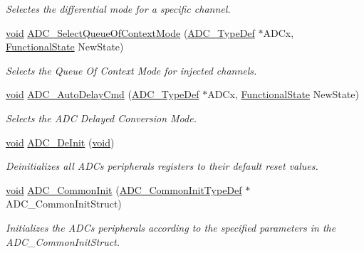 \begin{DoxyCompactItemize}
\begin{DoxyCompactList}\small\item\em Selectes the differential mode for a specific channel. \end{DoxyCompactList}\item 
\hyperlink{group___n_a_m_e_ga18028b8badbf1ea7e704ccac3c488e82}{void} \hyperlink{group___a_d_c___group1_ga0891691c716087a7dddb72a9e150b51c}{A\-D\-C\-\_\-\-Select\-Queue\-Of\-Context\-Mode} (\hyperlink{struct_a_d_c___type_def}{A\-D\-C\-\_\-\-Type\-Def} $\ast$A\-D\-Cx, \hyperlink{group___exported__types_gac9a7e9a35d2513ec15c3b537aaa4fba1}{Functional\-State} New\-State)
\begin{DoxyCompactList}\small\item\em Selects the Queue Of Context Mode for injected channels. \end{DoxyCompactList}\item 
\hyperlink{group___n_a_m_e_ga18028b8badbf1ea7e704ccac3c488e82}{void} \hyperlink{group___a_d_c___group1_ga71b4bc4e08686bc8b1b8812a7a44422c}{A\-D\-C\-\_\-\-Auto\-Delay\-Cmd} (\hyperlink{struct_a_d_c___type_def}{A\-D\-C\-\_\-\-Type\-Def} $\ast$A\-D\-Cx, \hyperlink{group___exported__types_gac9a7e9a35d2513ec15c3b537aaa4fba1}{Functional\-State} New\-State)
\begin{DoxyCompactList}\small\item\em Selects the A\-D\-C Delayed Conversion Mode. \end{DoxyCompactList}\item 
\hyperlink{group___n_a_m_e_ga18028b8badbf1ea7e704ccac3c488e82}{void} \hyperlink{group___a_d_c___group1_ga1962afdd9eebe5c896bbba2e4f26fe09}{A\-D\-C\-\_\-\-De\-Init} (\hyperlink{group___n_a_m_e_ga18028b8badbf1ea7e704ccac3c488e82}{void})
\begin{DoxyCompactList}\small\item\em Deinitializes all A\-D\-Cs peripherals registers to their default reset values. \end{DoxyCompactList}\item 
\hyperlink{group___n_a_m_e_ga18028b8badbf1ea7e704ccac3c488e82}{void} \hyperlink{group___a_d_c___group1_ga5803f6581a9cd7e90b6e637067102d94}{A\-D\-C\-\_\-\-Common\-Init} (\hyperlink{struct_a_d_c___common_init_type_def}{A\-D\-C\-\_\-\-Common\-Init\-Type\-Def} $\ast$A\-D\-C\-\_\-\-Common\-Init\-Struct)
\begin{DoxyCompactList}\small\item\em Initializes the A\-D\-Cs peripherals according to the specified parameters in the A\-D\-C\-\_\-\-Common\-Init\-Struct. \end{DoxyCompactList}\end{DoxyCompactItemize}


